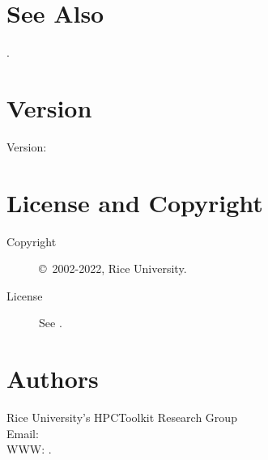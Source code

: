 \documentclass[english]{article}
\begin{document}

\section{See Also}

.

\section{Version}

Version: \Version

\section{License and Copyright}

\begin{description}
\item[Copyright] \copyright\ 2002-2022, Rice University.
\item[License] See .
\end{description}

\section{Authors}

\noindent
Rice University's HPCToolkit Research Group \\
Email:  \\
WWW: .

\LatexManEnd
\end{document}
